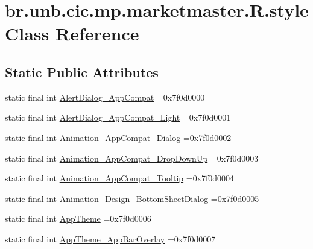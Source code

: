 \hypertarget{classbr_1_1unb_1_1cic_1_1mp_1_1marketmaster_1_1R_1_1style}{}\section{br.\+unb.\+cic.\+mp.\+marketmaster.\+R.\+style Class Reference}
\label{classbr_1_1unb_1_1cic_1_1mp_1_1marketmaster_1_1R_1_1style}
\subsection*{Static Public Attributes}
\begin{DoxyCompactItemize}
\item 
static final int \mbox{\hyperlink{classbr_1_1unb_1_1cic_1_1mp_1_1marketmaster_1_1R_1_1style_a05084142a48b711228d85b23b19b362c}{Alert\+Dialog\+\_\+\+App\+Compat}} =0x7f0d0000
\item 
static final int \mbox{\hyperlink{classbr_1_1unb_1_1cic_1_1mp_1_1marketmaster_1_1R_1_1style_a83c4b30ea52ac0fcfa430042e519de58}{Alert\+Dialog\+\_\+\+App\+Compat\+\_\+\+Light}} =0x7f0d0001
\item 
static final int \mbox{\hyperlink{classbr_1_1unb_1_1cic_1_1mp_1_1marketmaster_1_1R_1_1style_a616528c41e71e7df47065b2ef795c818}{Animation\+\_\+\+App\+Compat\+\_\+\+Dialog}} =0x7f0d0002
\item 
static final int \mbox{\hyperlink{classbr_1_1unb_1_1cic_1_1mp_1_1marketmaster_1_1R_1_1style_a6981fae91c94fa6c6dfd170370d002a8}{Animation\+\_\+\+App\+Compat\+\_\+\+Drop\+Down\+Up}} =0x7f0d0003
\item 
static final int \mbox{\hyperlink{classbr_1_1unb_1_1cic_1_1mp_1_1marketmaster_1_1R_1_1style_a91a90f44fbd62135cb469f1ece815a4b}{Animation\+\_\+\+App\+Compat\+\_\+\+Tooltip}} =0x7f0d0004
\item 
static final int \mbox{\hyperlink{classbr_1_1unb_1_1cic_1_1mp_1_1marketmaster_1_1R_1_1style_afbf016919971f88aab1d029d0df41470}{Animation\+\_\+\+Design\+\_\+\+Bottom\+Sheet\+Dialog}} =0x7f0d0005
\item 
static final int \mbox{\hyperlink{classbr_1_1unb_1_1cic_1_1mp_1_1marketmaster_1_1R_1_1style_af6f51a13aacf9d9575b9d68bd3d49d6c}{App\+Theme}} =0x7f0d0006
\item 
static final int \mbox{\hyperlink{classbr_1_1unb_1_1cic_1_1mp_1_1marketmaster_1_1R_1_1style_a67c014cda99ce9da296e7523f8c47a44}{App\+Theme\+\_\+\+App\+Bar\+Overlay}} =0x7f0d0007
\item 

\end{DoxyCompactItemize}

